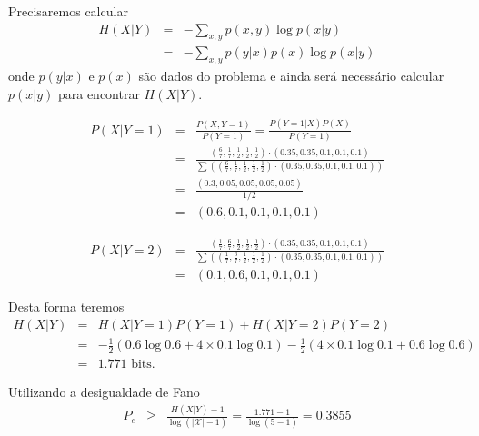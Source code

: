 \begin{frame}[allowframebreaks]
\begin{example}
  \examplebreak

  Precisaremos calcular 
  \begin{eqnarray}
  H(X|Y) &=& - \sum_{x,y} p(x,y) \log p(x|y) \nonumber \\
         &=& - \sum_{x,y} p(y|x) p(x) \log p(x|y)
  \end{eqnarray}
  onde $p(y|x)$ e $p(x)$ são dados do problema e ainda será necessário calcular $p(x|y)$ para encontrar $H(X|Y)$.

  \examplebreak

  \begin{eqnarray}
  P(X|Y=1) &=& \frac{P(X,Y=1)}{P(Y=1)} = \frac{P(Y=1|X)P(X)}{P(Y=1)} \nonumber \\
        &=& \frac{(\frac{6}{7}, \frac{1}{7}, \frac{1}{2}, \frac{1}{2}, \frac{1}{2}) \cdot (0.35, 0.35, 0.1, 0.1, 0.1) }{ \sum \left( (\frac{6}{7}, \frac{1}{7}, \frac{1}{2}, \frac{1}{2}, \frac{1}{2}) \cdot (0.35, 0.35, 0.1, 0.1, 0.1)  \right)  } \nonumber \\
        &=& \frac{(0.3, 0.05, 0.05, 0.05, 0.05)}{1/2} \nonumber \\
        &=& (0.6, 0.1, 0.1, 0.1, 0.1)
  \end{eqnarray}
  
  \examplebreak

  \begin{eqnarray}
  P(X|Y=2) &=& \frac{(\frac{1}{7}, \frac{6}{7}, \frac{1}{2}, \frac{1}{2}, \frac{1}{2}) \cdot (0.35, 0.35, 0.1, 0.1, 0.1) }{ \sum \left( (\frac{1}{7}, \frac{6}{7}, \frac{1}{2}, \frac{1}{2}, \frac{1}{2}) \cdot (0.35, 0.35, 0.1, 0.1, 0.1)  \right)  } \nonumber \\
        &=& (0.1, 0.6, 0.1, 0.1, 0.1)
  \end{eqnarray}

  \examplebreak 
  
  Desta forma teremos
  \begin{eqnarray}
  H(X|Y) &=& H(X|Y=1) P(Y=1) + H(X|Y=2) P(Y=2) \nonumber \\
        &=& - \frac{1}{2} \left( 0.6 \log 0.6 + 4 \times 0.1 \log 0.1 \right) - \frac{1}{2} \left( 4 \times 0.1 \log 0.1 + 0.6 \log 0.6 \right) \nonumber \\
        &=& 1.771 \text{ bits. }
  \end{eqnarray}

  Utilizando a desigualdade de Fano
  \begin{eqnarray}
  P_e &\geq& \frac{H(X|Y) - 1}{\log \left( \vert \mathcal{X} \vert -1 \right)} = \frac{1.771 - 1}{ \log (5-1)} = 0.3855
  \end{eqnarray}

  \end{example}
\end{frame}

